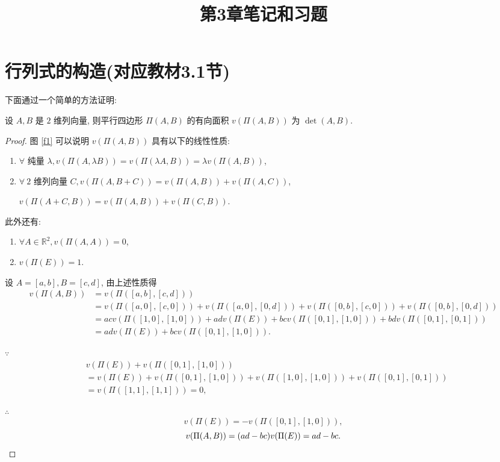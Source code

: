 \documentclass[color=black,device=normal,lang=cn,mode=geye]{elegantnote}
\title{第3章笔记和习题}
\begin{document}
\maketitle
\section{行列式的构造(对应教材3.1节)}
下面通过一个简单的方法证明:
\begin{theorem}
    设 $A,B$ 是 $2$ 维列向量, 则平行四边形 $\Pi(A,B)$ 的有向面积 $v(\Pi(A,B))$ 为 $\det(A,B)$.
\end{theorem}
\begin{proof}
    图 \ref{f1} 可以说明 $v(\Pi(A,B))$ 具有以下的线性性质:
    \begin{enumerate}
        \item $\forall$ 纯量 $\lambda,v(\Pi(A,\lambda B))=v(\Pi(\lambda A,B))=\lambda v(\Pi(A,B))$,
        \item $\forall\ 2$ 维列向量 $C,v(\Pi(A,B+C))=v(\Pi(A,B))+v(\Pi(A,C))$,
        
        $v(\Pi(A+C,B))=v(\Pi(A,B))+v(\Pi(C,B))$.
    \end{enumerate}

    此外还有:
    \begin{enumerate}
        \item $\forall A\in\mathbb{R}^2,v(\Pi(A,A))=0$,
        \item $v(\Pi(E))=1$.
    \end{enumerate}

    设 $A=[a,b],B=[c,d]$, 由上述性质得
    \begin{align*}
        v(\Pi(A,B)) & =v(\Pi([a,b],[c,d])) \\
        & =v(\Pi([a,0],[c,0]))+v(\Pi([a,0],[0,d]))+v(\Pi([0,b],[c,0]))+v(\Pi([0,b],[0,d])) \\
        & =acv(\Pi([1,0],[1,0]))+adv(\Pi(E))+bcv(\Pi([0,1],[1,0]))+bdv(\Pi([0,1],[0,1])) \\
        & =adv(\Pi(E))+bcv(\Pi([0,1],[1,0])).
    \end{align*}

    $\because$
    \begin{align*}
        & v(\Pi(E))+v(\Pi([0,1],[1,0])) \\
        & =v(\Pi(E))+v(\Pi([0,1],[1,0]))+v(\Pi([1,0],[1,0]))+v(\Pi([0,1],[0,1])) \\
        & =v(\Pi([1,1],[1,1]))=0,
    \end{align*}

    $\therefore$
    \[v(\Pi(E))=-v(\Pi([0,1],[1,0])),\]
    \[v(\Pi(A,B))=(ad-bc)v(\Pi(E))=ad-bc.\qedhere\]
\end{proof}
\end{document}
